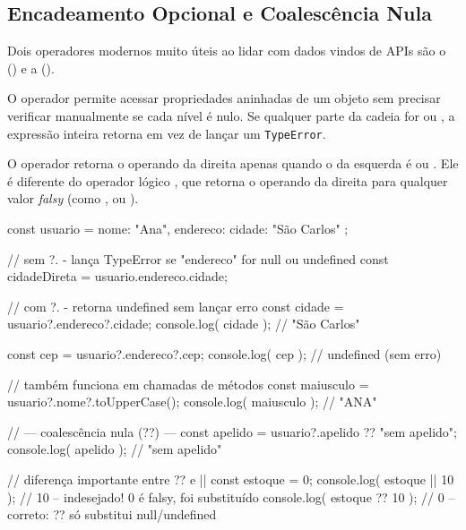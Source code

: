 \subsection{Encadeamento Opcional e Coalescência Nula}

Dois operadores modernos muito úteis ao lidar com dados vindos de APIs são o  () e a  ().

O operador  permite acessar propriedades aninhadas de um objeto sem precisar verificar manualmente se cada nível é nulo. Se qualquer parte da cadeia for  ou , a expressão inteira retorna  em vez de lançar um \texttt{TypeError}.

O operador  retorna o operando da direita apenas quando o da esquerda é  ou . Ele é diferente do operador lógico \inlineJavaScriptCode{||}, que retorna o operando da direita para qualquer valor \textit{falsy} (como ,  ou ).

\begin{boxJavaScriptCode}[title=Encadeamento opcional e coalescência nula]
const usuario = {
    nome: "Ana",
    endereco: { cidade: "São Carlos" }
};

// sem ?. - lança TypeError se "endereco" for null ou undefined
const cidadeDireta = usuario.endereco.cidade;

// com ?. - retorna undefined sem lançar erro
const cidade = usuario?.endereco?.cidade;
console.log( cidade ); // "São Carlos"

const cep = usuario?.endereco?.cep;
console.log( cep ); // undefined (sem erro)

// também funciona em chamadas de métodos
const maiusculo = usuario?.nome?.toUpperCase();
console.log( maiusculo ); // "ANA"

// --- coalescência nula (??) ---
const apelido = usuario?.apelido ?? "sem apelido";
console.log( apelido ); // "sem apelido"

// diferença importante entre ?? e ||
const estoque = 0;
console.log( estoque || 10 ); // 10 -- indesejado! 0 é falsy, foi substituído
console.log( estoque ?? 10 ); // 0  -- correto: ?? só substitui null/undefined
\end{boxJavaScriptCode}

